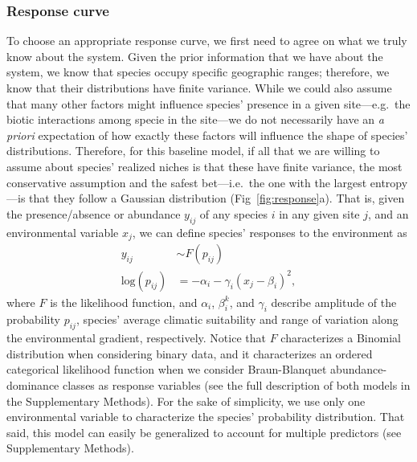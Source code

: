 \documentclass[11pt, a4paper]{article}
\begin{document}
\subsubsection*{Response curve}
To choose an appropriate response curve, we first need to agree on what we truly know about the system. Given the prior information that we have about the system, we know that species occupy specific geographic ranges; therefore, we know that their distributions have finite variance. While we could also assume that many other factors might influence species' presence in a given site---e.g.~the biotic interactions among specie in the site---we do not necessarily have an \textit{a priori} expectation of how exactly these factors will influence the shape of species' distributions. Therefore, for this baseline model, if all that we are willing to assume about species' realized niches is that these have finite variance, the most conservative assumption and the safest bet---i.e.~the one with the largest entropy---is that they follow a Gaussian distribution (Fig~\ref{fig:response}a). That is, given the presence/absence or abundance $y_{ij}$ of any species $i$ in any given site $j$, and an environmental variable $x_{j}$, we can define species' responses to the environment as
\begin{equation}
\begin{split}
y_{ij} & \sim F\left(p_{ij}\right) \\
\text{log}\left(p_{ij}\right) & = -\alpha_{i} - \gamma_{i} \left(x_{j}-\beta_{i}\right)^2 ,
\end{split}
\label{eq:baseline-response}
\end{equation}
where $F$ is the likelihood function, and $\alpha_i$, $\beta_i^k$, and $\gamma_i$ describe amplitude of the probability $p_{ij}$, species' average climatic suitability and range of variation along the environmental gradient, respectively. Notice that $F$ characterizes a Binomial distribution when considering binary data, and it characterizes an ordered categorical likelihood function when we consider Braun-Blanquet abundance-dominance classes as response variables (see the full description of both models in the Supplementary Methods). For the sake of simplicity, we use only one environmental variable to characterize the                                                                             species' probability distribution. That said, this model can easily be generalized to account for multiple predictors (see Supplementary Methods).
\end{document}

